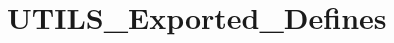 \hypertarget{group___u_t_i_l_s___exported___defines}{}\section{U\+T\+I\+L\+S\+\_\+\+Exported\+\_\+\+Defines}
\label{group___u_t_i_l_s___exported___defines}
